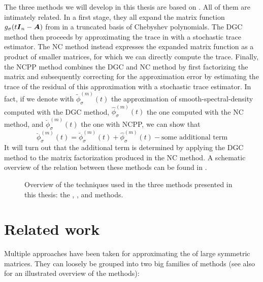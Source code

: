 The three methods we will develop in this thesis are based on \cite{lin2017randomized}.
All of them are intimately related. In a first stage, they all expand the matrix
function $g_{\sigma}(t\boldsymbol{I}_n - \boldsymbol{A})$ from
 in a truncated basis of
Chebyshev polynomials. The \gls{DGC} method then proceeds by approximating the
trace in  with a stochastic
trace estimator. The \gls{NC} method instead expresses the expanded matrix function
as a product of smaller matrices, for which we can directly compute the trace.
Finally, the \gls{NCPP} method combines the \gls{DGC} and \gls{NC} method
by first factorizing the matrix and subsequently correcting for the approximation
error by estimating the trace of the residual of this approximation with a stochastic trace estimator.
In fact, if we denote with $\widetilde{\phi}_{\sigma}^{(m)}(t)$ the approximation
of \gls{smooth-spectral-density} computed with the \gls{DGC} method, $\widehat{\phi}_{\sigma}^{(m)}(t)$ the
one computed with the \gls{NC} method, and $\breve{\phi}_{\sigma}^{(m)}(t)$ the one
with \gls{NCPP}, we can show that
\begin{equation}
    \breve{\phi}_{\sigma}^{(m)}(t) = \widetilde{\phi}_{\sigma}^{(m)}(t) + \widehat{\phi}_{\sigma}^{(m)}(t) - \text{some additional term}
    \label{equ:1-introduction-relation-methods}
\end{equation}
It will turn out that the additional term is determined by applying
the \gls{DGC} method to the matrix factorization produced in the \gls{NC} method.
A schematic overview of the relation between these methods can be found
in .

\begin{figure}[ht]
    \centering
    
    \caption{Overview of the techniques used in the three methods presented
    in this thesis: the , , and  methods.}
    \label{fig:1-introduction-methods-overview}
\end{figure}


\section{Related work}
\label{sec:1-introduction-related}

Multiple approaches have been taken for approximating the 
of large symmetric matrices. They can loosely be grouped into two big families
of methods (see also  for an
illustrated overview of the methods):

